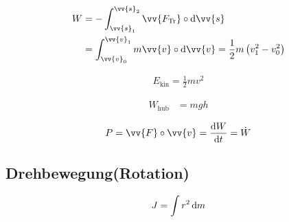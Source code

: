 \begin{boxleft}
\end{boxleft}\begin{boxrightshaded}
\begin{align*}
W&=-\int_{\vv{s}_1}^{\vv{s}_2}\vv{F_{\text{Tr}}}\circ\diff \vv{s}\\
&=\int_{\vv{v}_0}^{\vv{v}_1}m\vv{v}\circ\diff \vv{v}=\frac{1}{2}m\left(v_1^2-v_0^2\right) 
\end{align*}
\end{boxrightshaded}

\begin{boxleft}
\end{boxleft}\begin{boxrightshaded}
\begin{align*}
E_{\text{kin}}=\frac{1}{2}mv^2
\end{align*}
\end{boxrightshaded}


\begin{boxleft}
\end{boxleft}\begin{boxrightshaded}
\begin{align*}
W_{\text{hub}}&=mgh
\end{align*}
\end{boxrightshaded}

\begin{boxleft}
\end{boxleft}\begin{boxrightshaded}
\begin{align*}
P=\vv{F}\circ\vv{v}=\frac{\diff W}{\diff t}=\dot{W}
\end{align*}
\end{boxrightshaded}


\subsection{Drehbewegung(Rotation)}

\begin{boxleft}
\end{boxleft}\begin{boxrightshaded}
\begin{align*}
J=\int r^2 \mathop{}\!\mathrm{d} m
\end{align*}
\end{boxrightshaded}

